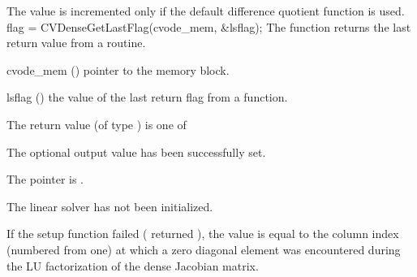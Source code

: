 {
  The value  is incremented only if the default 
   difference quotient function is used.
}
{
  flag = CVDenseGetLastFlag(cvode\_mem, \&lsflag);
}
{
  The function  returns the
  last return value from a {\cvdense} routine. 
}
{
  \begin{args}
  \item[cvode\_mem] ()
    pointer to the {\cvode} memory block.
  \item[lsflag] ()
    the value of the last return flag from a {\cvdense} function.
  \end{args}
}
{
  The return value  (of type ) is one of
  \begin{args}
  \item[\Id{CVDENSE\_SUCCESS}] 
    The optional output value has been successfully set.
  \item[\Id{CVDENSE\_MEM\_NULL}]
    The  pointer is .
  \item[\Id{CVDENSE\_LMEM\_NULL}]
    The {\cvdense} linear solver has not been initialized.
  \end{args}
}
{
  If the {\cvdense} setup function failed ( returned ),
  the value  is equal to the column index (numbered from one) at which
  a zero diagonal element was encountered during the LU factorization of the 
  dense Jacobian matrix.
}

